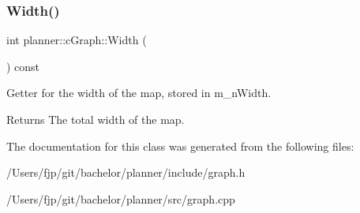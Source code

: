 \subsubsection{\texorpdfstring{Width()}{Width()}}
{\footnotesize\ttfamily int planner\+::c\+Graph\+::\+Width (\begin{DoxyParamCaption}{ }\end{DoxyParamCaption}) const}



Getter for the width of the map, stored in m\+\_\+n\+Width. 

\begin{DoxyReturn}{Returns}
The total width of the map. 
\end{DoxyReturn}


The documentation for this class was generated from the following files\+:\begin{DoxyCompactItemize}
\item 
/\+Users/fjp/git/bachelor/planner/include/graph.\+h\item 
/\+Users/fjp/git/bachelor/planner/src/graph.\+cpp\end{DoxyCompactItemize}
